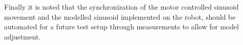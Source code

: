 Finally it is noted that the synchronization of the motor controlled sinusoid movement and the modelled sinusoid implemented on the robot, should be automated for a future test setup through measurements to allow  for model adjustment.
